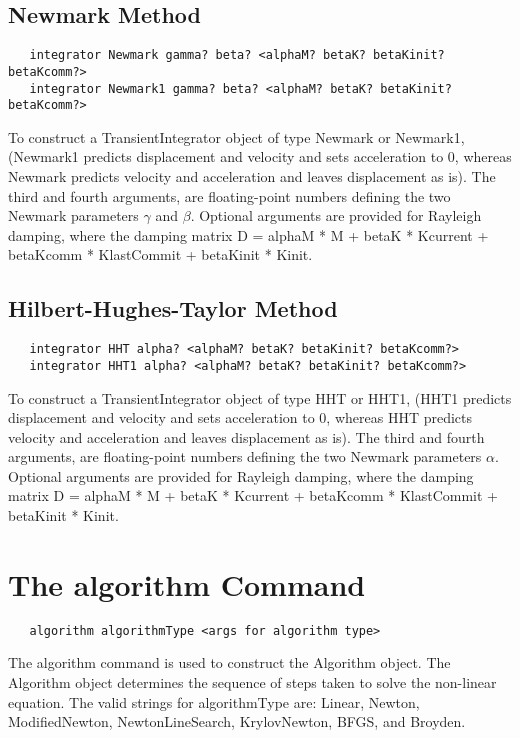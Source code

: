 \documentclass[12pt]{article}
\begin{document}
\subsection{Newmark Method}

{\sf\small
\begin{verbatim}
   integrator Newmark gamma? beta? <alphaM? betaK? betaKinit? betaKcomm?> 
   integrator Newmark1 gamma? beta? <alphaM? betaK? betaKinit? betaKcomm?> 
\end{verbatim}
}

To construct a TransientIntegrator object of type Newmark or Newmark1,
(Newmark1 predicts displacement and velocity and sets acceleration to
$0$, whereas Newmark predicts velocity and acceleration and leaves
displacement as is). The third and fourth arguments, are
floating-point numbers defining the two Newmark parameters $\gamma$ and
$\beta$. Optional arguments are provided for Rayleigh damping, where
the damping matrix D = alphaM * M + betaK * Kcurrent + betaKcomm *
KlastCommit + betaKinit * Kinit.

\subsection{Hilbert-Hughes-Taylor Method}

{\sf\small
\begin{verbatim}
   integrator HHT alpha? <alphaM? betaK? betaKinit? betaKcomm?> 
   integrator HHT1 alpha? <alphaM? betaK? betaKinit? betaKcomm?> 
\end{verbatim}
}

To construct a TransientIntegrator object of type HHT or HHT1,
(HHT1 predicts displacement and velocity and sets acceleration to
$0$, whereas HHT predicts velocity and acceleration and leaves
displacement as is). The third and fourth arguments, are
floating-point numbers defining the two Newmark parameters
$\alpha$. Optional arguments are provided for Rayleigh damping, where
the damping matrix D = alphaM * M + betaK * Kcurrent + betaKcomm *
KlastCommit + betaKinit * Kinit.

\section {The algorithm Command}
{\sf\small
\begin{verbatim}
   algorithm algorithmType <args for algorithm type>
\end{verbatim}
}

The algorithm command is used to construct the Algorithm
object. The Algorithm object determines the sequence of steps taken
to solve the non-linear equation. The valid strings for algorithmType
are: Linear, Newton, ModifiedNewton, NewtonLineSearch, KrylovNewton,
BFGS, and Broyden.
\end{document}
